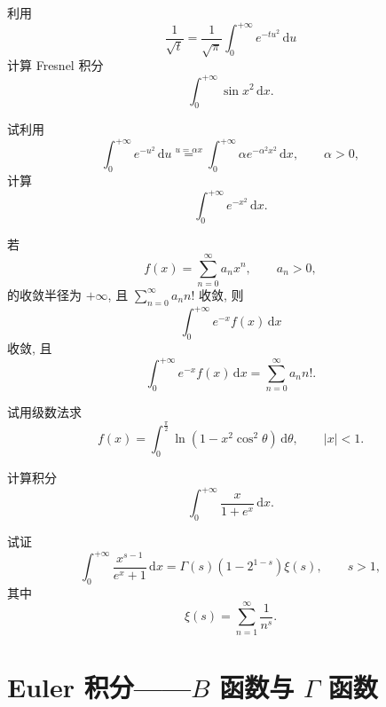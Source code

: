 \documentclass[../数学分析培优讲义.tex]{subfiles}
\begin{document}
\begin{example}
利用
\[
    \dfrac{1}{\sqrt{t}}=\dfrac{1}{\sqrt{\pi}}\int_0^{+\infty}e^{-tu^2}\,\mathrm{d}u
\]
计算 Fresnel 积分
\[
    \int_0^{+\infty}\sin x^2\,\mathrm{d}x.
\]
\end{example}
\exampleblank

\begin{example}
试利用
\[
    \int_0^{+\infty}e^{-u^2}\,\mathrm{d}u
    \overset{u=\alpha x}{=}
    \int_0^{+\infty}\alpha e^{-\alpha^2x^2}\,\mathrm{d}x,
    \qquad \alpha>0,
\]
计算
\[
    \int_0^{+\infty}e^{-x^2}\,\mathrm{d}x.
\]
\end{example}
\exampleblank

\begin{example}
若
\[
    f(x)=\sum\limits_{n=0}^{\infty}a_nx^n,\qquad a_n>0,
\]
的收敛半径为 $+\infty$, 且 $\displaystyle\sum\limits_{n=0}^{\infty}a_nn!$ 收敛, 则
\[
    \int_0^{+\infty}e^{-x}f(x)\,\mathrm{d}x
\]
收敛, 且
\[
    \int_0^{+\infty}e^{-x}f(x)\,\mathrm{d}x
    =\sum\limits_{n=0}^{\infty}a_nn!.
\]
\end{example}
\exampleblank

\begin{example}
试用级数法求
\[
    f(x)=\int_0^{\frac{\pi}{2}}\ln(1-x^2\cos^2\theta)\,\mathrm{d}\theta,
    \qquad |x|<1.
\]
\end{example}
\exampleblank

\begin{example}
计算积分
\[
    \int_0^{+\infty}\dfrac{x}{1+e^x}\,\mathrm{d}x.
\]
\end{example}
\exampleblank

\begin{example}[\markstar]
试证
\[
    \int_0^{+\infty}\dfrac{x^{s-1}}{e^x+1}\,\mathrm{d}x
    =\Gamma(s)(1-2^{1-s})\xi(s),\qquad s>1,
\]
其中
\[
    \xi(s)=\sum\limits_{n=1}^{\infty}\dfrac{1}{n^s}.
\]
\end{example}
\exampleblank


\newpage

\section{\texorpdfstring{Euler 积分——$B$ 函数与 $\Gamma$ 函数}{Euler 积分——B 函数与 Gamma 函数}}
\end{document}
